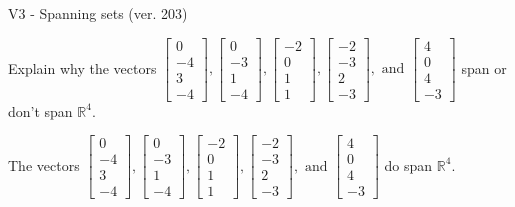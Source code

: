 \begin{exercise}
  \begin{exerciseTitle}V3 - Spanning sets (ver. 203)\end{exerciseTitle}
  \begin{exerciseStatement}
    Explain why the vectors \(\left[\begin{array}{r}
0 \\
-4 \\
3 \\
-4
\end{array}\right] , \left[\begin{array}{r}
0 \\
-3 \\
1 \\
-4
\end{array}\right] , \left[\begin{array}{r}
-2 \\
0 \\
1 \\
1
\end{array}\right] , \left[\begin{array}{r}
-2 \\
-3 \\
2 \\
-3
\end{array}\right] , \text{ and } \left[\begin{array}{r}
4 \\
0 \\
4 \\
-3
\end{array}\right]\) span or don't span \(\mathbb{R}^4\). 
	


  \end{exerciseStatement}
  \begin{exerciseAnswer}
   The vectors \(\left[\begin{array}{r}
0 \\
-4 \\
3 \\
-4
\end{array}\right] , \left[\begin{array}{r}
0 \\
-3 \\
1 \\
-4
\end{array}\right] , \left[\begin{array}{r}
-2 \\
0 \\
1 \\
1
\end{array}\right] , \left[\begin{array}{r}
-2 \\
-3 \\
2 \\
-3
\end{array}\right] , \text{ and } \left[\begin{array}{r}
4 \\
0 \\
4 \\
-3
\end{array}\right]\) 
  	 do  
	span \(\mathbb{R}^4\).
  



\end{exerciseAnswer}
\end{exercise}
